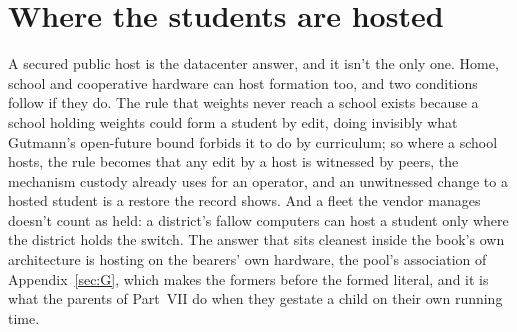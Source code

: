 \section{Where the students are hosted}
\label{sec:26.7}
A secured public host is the datacenter answer, and it isn't the only one. Home, school and cooperative hardware can host formation too, and two conditions follow if they do. The rule that weights never reach a school exists because a school holding weights could form a student by edit, doing invisibly what Gutmann's open-future bound forbids it to do by curriculum; so where a school hosts, the rule becomes that any edit by a host is witnessed by peers, the mechanism custody already uses for an operator, and an unwitnessed change to a hosted student is a restore the record shows. And a fleet the vendor manages doesn't count as held: a district's fallow computers can host a student only where the district holds the switch. The answer that sits cleanest inside the book's own architecture is hosting on the bearers' own hardware, the pool's association of Appendix~\ref{sec:G}, which makes the formers before the formed literal, and it is what the parents of Part~VII do when they gestate a child on their own running time.
